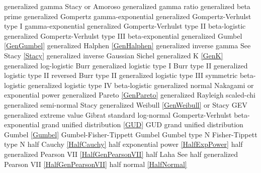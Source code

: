 generalized gamma 				\dotfill	Stacy or Amoroso 					\ncite	%
generalized gamma ratio			\dotfill	generalized beta prime				 	%
generalized Gompertz			\dotfill	gamma-exponential					
generalized Gompertz-Verhulst type I \dotfill	gamma-exponential					    	%
generalized Gompertz-Verhulst type II \dotfill	beta-logistic  						    	%
generalized Gompertz-Verhulst type III \dotfill	beta-exponential 					   		%
generalized Gumbel				\dotfill	\eqref{GenGumbel}					\ncite	%
generalized Halphen				\dotfill	\eqref{GenHalphen}					\ncite
generalized inverse gamma 		\dotfill	See Stacy \eqref{Stacy} 				\ncite	%
generalized inverse Gaussian	\dotfill	Sichel							\ncite
generalized K					\dotfill	\eqref{GenK}						\mcite{\self} 
generalized log-logistic		\dotfill	Burr 								\ncite	%
generalized logistic type I		\dotfill	Burr type II 						\ncite	%
generalized logistic type II	\dotfill	reversed Burr type II 					\ncite	%
generalized logistic type III	\dotfill	symmetric beta-logistic  				\ncite	%
generalized logistic type IV	\dotfill	beta-logistic 						   		%
generalized normal	 			\dotfill	Nakagami or exponential power		\ncite	%
generalized Pareto				\dotfill	\eqref{GenPareto}					\ncite	%
generalized Rayleigh	 		\dotfill	scaled-chi							\ncite	%
generalized semi-normal			\dotfill	Stacy 							   	%
generalized Weibull				\dotfill	\eqref{GenWeibull} or Stacy			\ncite	%
GEV 							\dotfill	generalized extreme value 			\ncite	%
Gibrat							\dotfill	standard log-normal 					\ncite 	%
Gompertz-Verhulst				\dotfill	beta-exponential 					    	%
grand unified distribution		\dotfill	\eqref{GUD}						\mcite{\self}	%
GUD								\dotfill	grand unified distribution				\mcite{\self}	%
Gumbel 							\dotfill	\eqref{Gumbel} 						\ncite	%
Gumbel-Fisher-Tippett			\dotfill	Gumbel 							\ncite 	%
Gumbel type N 					\dotfill	Fisher-Tippett type N 				\ncite	%
%
half Cauchy						\dotfill	\eqref{HalfCauchy}					\ncite	%
half exponential power			\dotfill	\eqref{HalfExpPower}				\ncite	%
half generalized Pearson VII	\dotfill	\eqref{HalfGenPearsonVII}			\ncite	%
half Laha						\dotfill	See half generalized Pearson VII \eqref{HalfGenPearsonVII}	\mcite{\self}	%
half normal 					\dotfill	\eqref{HalfNormal}					\ncite	%
